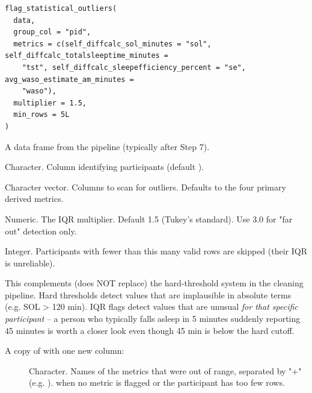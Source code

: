 \documentclass[a4paper]{book}
\begin{document}
%
\begin{Usage}
\begin{verbatim}
flag_statistical_outliers(
  data,
  group_col = "pid",
  metrics = c(self_diffcalc_sol_minutes = "sol", self_diffcalc_totalsleeptime_minutes =
    "tst", self_diffcalc_sleepefficiency_percent = "se", avg_waso_estimate_am_minutes =
    "waso"),
  multiplier = 1.5,
  min_rows = 5L
)
\end{verbatim}
\end{Usage}
%
\begin{Arguments}
\begin{ldescription}
\item[\code{data}] A data frame from the pipeline (typically after Step 7).

\item[\code{group\_col}] Character. Column identifying participants (default
).

\item[\code{metrics}] Character vector. Columns to scan for outliers.
Defaults to the four primary derived metrics.

\item[\code{multiplier}] Numeric. The IQR multiplier. Default 1.5 (Tukey's
standard). Use 3.0 for "far out" detection only.

\item[\code{min\_rows}] Integer. Participants with fewer than this many valid
rows are skipped (their IQR is unreliable).
\end{ldescription}
\end{Arguments}
%
\begin{Details}
This complements (does NOT replace) the hard-threshold system in the
cleaning pipeline. Hard thresholds detect values that are implausible
in absolute terms (e.g. SOL > 120 min). IQR flags detect values that
are unusual \emph{for that specific participant} -- a person who
typically falls asleep in 5 minutes suddenly reporting 45 minutes is
worth a closer look even though 45 min is below the hard cutoff.
\end{Details}
%
\begin{Value}
A copy of  with one new column:
\begin{description}

\item[] Character. Names of the metrics that were
out of range, separated by "+" (e.g. ). 
when no metric is flagged or the participant has too few rows.

\end{description}

\end{Value}
\end{document}
